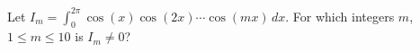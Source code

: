Let $I_m = \int_0^{2\pi} \cos(x)\cos(2x)\cdots \cos(mx)\,dx$. For
which integers $m$, $1 \leq m \leq 10$ is $I_m \neq 0$?
